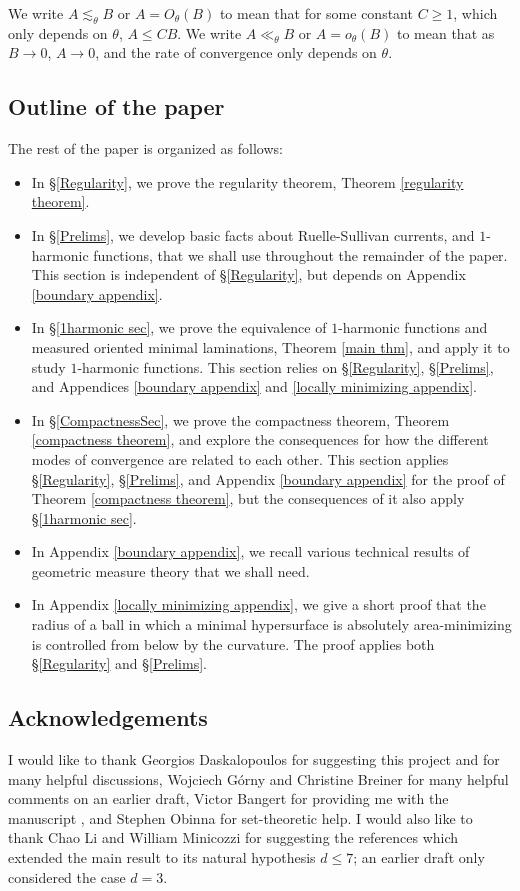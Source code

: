 \documentclass[reqno,11pt]{amsart}
\theoremstyle{definition}
\numberwithin{equation}{section}
\begin{document}
We write $A \lesssim_\theta B$ or $A = O_\theta(B)$ to mean that for some constant $C \geq 1$, which only depends on $\theta$, $A \leq CB$.
We write $A \ll_\theta B$ or $A = o_\theta(B)$ to mean that as $B \to 0$, $A \to 0$, and the rate of convergence only depends on $\theta$.

\subsection{Outline of the paper}
The rest of the paper is organized as follows:
\begin{itemize}
\item In \S\ref{Regularity}, we prove the regularity theorem, Theorem \ref{regularity theorem}.
\item In \S\ref{Prelims}, we develop basic facts about Ruelle-Sullivan currents, and $1$-harmonic functions, that we shall use throughout the remainder of the paper. This section is independent of \S\ref{Regularity}, but depends on Appendix \ref{boundary appendix}.
\item In \S\ref{1harmonic sec}, we prove the equivalence of $1$-harmonic functions and measured oriented minimal laminations, Theorem \ref{main thm}, and apply it to study $1$-harmonic functions. This section relies on \S\ref{Regularity}, \S\ref{Prelims}, and Appendices \ref{boundary appendix} and \ref{locally minimizing appendix}.
\item In \S\ref{CompactnessSec}, we prove the compactness theorem, Theorem \ref{compactness theorem}, and explore the consequences for how the different modes of convergence are related to each other. This section applies \S\ref{Regularity}, \S\ref{Prelims}, and Appendix \ref{boundary appendix} for the proof of Theorem \ref{compactness theorem}, but the consequences of it also apply \S\ref{1harmonic sec}.
\item In Appendix \ref{boundary appendix}, we recall various technical results of geometric measure theory that we shall need.
\item In Appendix \ref{locally minimizing appendix}, we give a short proof that the radius of a ball in which a minimal hypersurface is absolutely area-minimizing is controlled from below by the curvature. The proof applies both \S\ref{Regularity} and \S\ref{Prelims}.
\end{itemize}


\subsection{Acknowledgements}
I would like to thank Georgios Daskalopoulos for suggesting this project and for many helpful discussions, Wojciech Górny and Christine Breiner for many helpful comments on an earlier draft, Victor Bangert for providing me with the manuscript \cite{Auer12}, and Stephen Obinna for set-theoretic help.
I would also like to thank Chao Li and William Minicozzi for suggesting the references \cite{chodosh2022complete, Schoen75, Schoen81} which extended the main result to its natural hypothesis $d \leq 7$; an earlier draft only considered the case $d = 3$.
\end{document}
